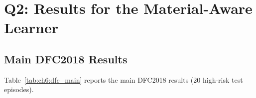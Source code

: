 \section{Q2: Results for the Material-Aware Learner}
\label{sec:ch6:mat_results}

\subsection{Main DFC2018 Results}
\label{subsec:ch6:dfc_main}

Table~\ref{tab:ch6:dfc_main} reports the main DFC2018 results
(20 high-risk test episodes).

\begin{table}[t]
\centering
\caption{%
  \textbf{DFC2018 main results (20 high-risk test episodes).}
  Values are mean $\pm$ 95\% CI (bootstrap over 20 episodes,
  10{,}000 resamples).
  Stage~2 reduces cumulative risk by 56.4\% over Stage~1 and 17.4\%
  over Blind Dijkstra, closing 23.2\% of the Blind$\to$Oracle risk gap
  $[(12.92{-}10.67)/(12.92{-}3.22){=}23.2\%]$.
  Stage~2 path length (253.0\,m) is 1.1\% \emph{shorter} than Stage~1 (255.8\,m).
  Stage~1 vs.\ Stage~2 risk exposure: $p{<}0.001$ (paired Wilcoxon signed-rank,
  20 matched episodes).
}
\label{tab:ch6:dfc_main}
\small
\setlength{\tabcolsep}{4pt}
\renewcommand{\arraystretch}{1.2}
\end{table}

